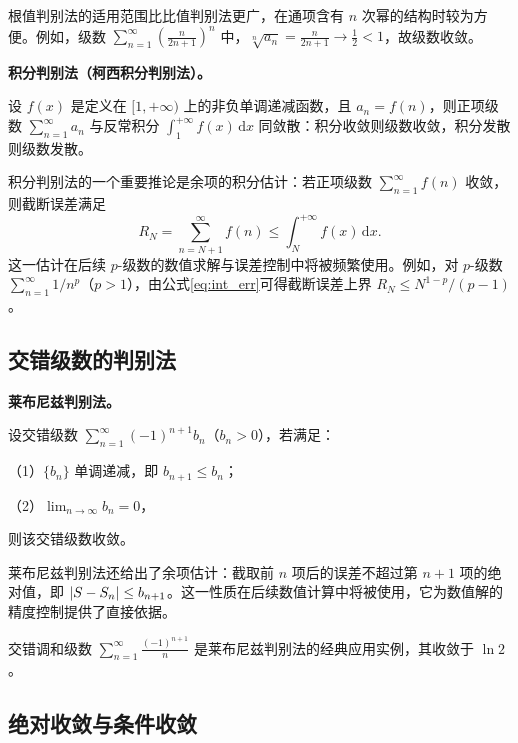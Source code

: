 根值判别法的适用范围比比值判别法更广，在通项含有 $n$ 次幂的结构时较为方便。例如，级数 $\displaystyle \sum_{n=1}^{\infty} \left(\frac{n}{2n+1}\right)^n$ 中，$\sqrt[n]{a_n} = \frac{n}{2n+1} \to \frac{1}{2} < 1$，故级数收敛。

\textbf{积分判别法（柯西积分判别法）。}

\begin{theorem}[积分判别法]
设 $f(x)$ 是定义在 $[1, +\infty)$ 上的非负单调递减函数，且 $a_n = f(n)$，则正项级数 $\displaystyle \sum_{n=1}^{\infty} a_n$ 与反常积分 $\displaystyle \int_1^{+\infty} f(x)\, \mathrm{d}x$ 同敛散：积分收敛则级数收敛，积分发散则级数发散。
\end{theorem}

积分判别法的一个重要推论是余项的积分估计：若正项级数 $\displaystyle \sum_{n=1}^{\infty} f(n)$ 收敛，则截断误差满足
\begin{equation} \label{eq:int_err}
R_N = \sum_{n=N+1}^{\infty} f(n) \leq \int_N^{+\infty} f(x)\, \mathrm{d}x.
\end{equation}
这一估计在后续 $p$-级数的数值求解与误差控制中将被频繁使用。例如，对 $p$-级数 $\displaystyle \sum_{n=1}^{\infty} 1/n^p$（$p > 1$），由公式\eqref{eq:int_err}可得截断误差上界 $R_N \leq N^{1-p}/(p-1)$。

\subsection{交错级数的判别法}

\textbf{莱布尼兹判别法。}

\begin{theorem}[莱布尼兹判别法]
设交错级数 $\displaystyle \sum_{n=1}^{\infty} (-1)^{n+1} b_n$（$b_n > 0$），若满足：

（1）$\{b_n\}$ 单调递减，即 $b_{n+1} \leq b_n$；

（2）$\displaystyle \lim_{n \to \infty} b_n = 0$，

则该交错级数收敛。
\end{theorem}

莱布尼兹判别法还给出了余项估计：截取前 $n$ 项后的误差不超过第 $n+1$ 项的绝对值，即 $\left|S - S_n\right| \leq b_{n+1}$。这一性质在后续数值计算中将被使用，它为数值解的精度控制提供了直接依据。

交错调和级数 $\displaystyle \sum_{n=1}^{\infty} \frac{(-1)^{n+1}}{n}$ 是莱布尼兹判别法的经典应用实例，其收敛于 $\ln 2$。

\subsection{绝对收敛与条件收敛}

